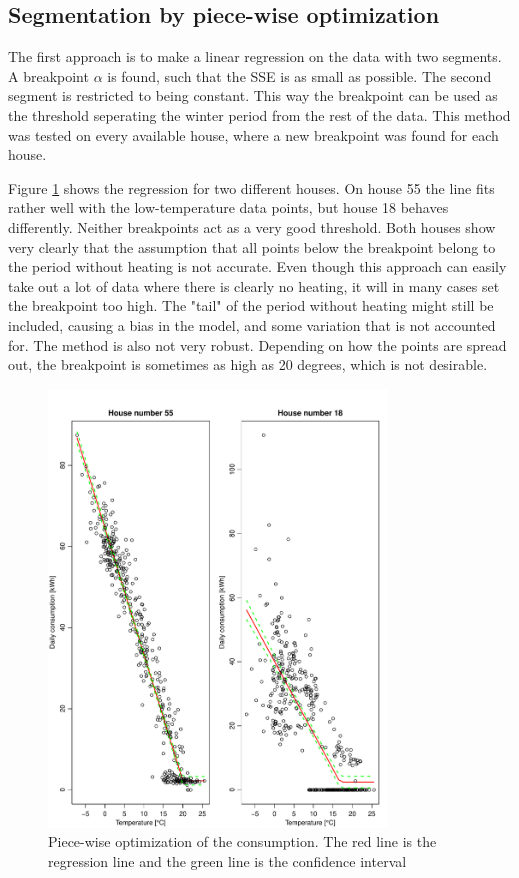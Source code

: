 \subsection{Segmentation by piece-wise optimization}
The first approach is to make a linear regression on the data with two segments. A breakpoint
$\alpha$ is found, such that the SSE is as small as possible. The second segment is restricted to
being constant. This way the breakpoint can be used as the threshold seperating the winter period from the rest of the data. This method was tested on every available
house, where a new breakpoint was found for each house.

\noindent Figure \ref{fig: Consumption-PW} shows the regression for two different houses. On house 55 the
line fits rather well with the low-temperature data points, but house 18 behaves differently. Neither breakpoints act as a very good threshold. Both houses show very clearly that the assumption that all points below the breakpoint belong to the period without heating is not accurate. Even though this approach can easily take out a lot of data
where there is clearly no heating, it will in many cases set the breakpoint too high. The "tail" of the period without heating might still be included, causing a bias in the model, and some variation that is not accounted for. The method is also not very robust. Depending on how the points are spread out, the breakpoint is sometimes as high as 20 degrees, which is not desirable.
\begin{figure}
    \centering
    \includegraphics[width=0.8\textwidth]{../../../figures/Consumption_PW.pdf}
    \caption{Piece-wise optimization of the consumption. The red line is the regression line and the green line is the confidence interval}
    \label{fig: Consumption-PW}
\end{figure}


